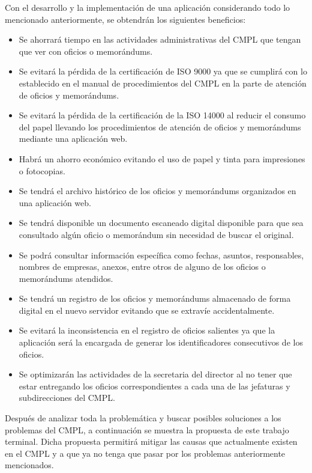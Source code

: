 Con el desarrollo y la implementación de una aplicación considerando todo lo mencionado anteriormente, se obtendrán los siguientes beneficios:
\begin{itemize}
	\item Se ahorrará tiempo en las actividades administrativas del CMPL que tengan que ver con oficios o memorándums.
	\item Se evitará la pérdida de la certificación de ISO 9000 ya que se cumplirá con lo establecido en el manual de procedimientos del CMPL en la parte de atención de oficios y memorándums.
	\item Se evitará la pérdida de la certificación de la ISO 14000 al reducir el consumo del papel llevando los procedimientos de atención de oficios y memorándums mediante una aplicación web.
	\item Habrá un ahorro económico evitando el uso de papel y tinta para impresiones o fotocopias.
	\item Se tendrá el archivo histórico de los oficios y memorándums organizados en una aplicación web.
	\item Se tendrá disponible un documento escaneado digital disponible para que sea consultado algún oficio o memorándum sin necesidad de buscar el original.
	\item Se podrá consultar información específica como fechas, asuntos, responsables, nombres de empresas, anexos, entre otros de alguno de los oficios o memorándums atendidos.
	\item Se tendrá un registro de los oficios y memorándums almacenado de forma digital en el nuevo servidor evitando que se extravíe accidentalmente.
	\item Se evitará la inconsistencia en el registro de oficios salientes ya que la aplicación será la encargada de generar los identificadores consecutivos de los oficios.
	\item Se optimizarán las actividades de la secretaria del director al no tener que estar entregando los oficios correspondientes a cada una de las jefaturas y subdirecciones del CMPL. 
\end{itemize}

Después de analizar toda la problemática y buscar posibles soluciones a los problemas del CMPL, a continuación se muestra la propuesta de este trabajo terminal. Dicha propuesta permitirá mitigar las causas que actualmente existen en el CMPL y a que ya no tenga que pasar por los problemas anteriormente mencionados.